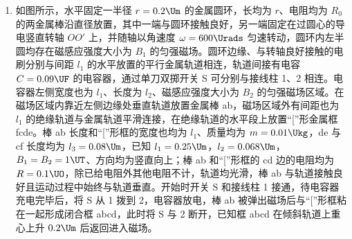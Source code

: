 \documentclass[\gkver]{gaokaozhenti}
\begin{document}
\begin{enumerate}
{	$mgl\sin37^{\circ}+mgR(1-\cos37^{\circ})=\frac{1}{2}mv^{2}$

	C 点时

	$F_{N}-mg=m\frac{v_{C}^{2}}{R}$

	$F_{N}=7\UN$

	（2）

	$mgl_{x}\sin37^{\circ}-4mgR\cos37^{\circ}=\frac{1}{2}mv^{2}$

	$v=\sqrt{12l_{x}-9.6}$

	能过最高点时，则能到 F 点，则恰到最高点时

	$mgl_{x}\sin37^{\circ}-mg(3R\cos37^{\circ}+R)=0$

	$l_{x}\geq0.85\Um$

	（3）设摩擦力做功为第一次到达中点时的 $n$ 倍

	$mgl_{x}\sin37^{\circ}-mg\frac{l_{FG}}{2}\sin37^{\circ}-n\mu mg\frac{l_{FG}}{2}\cos37^{\circ}=0$

	解得

	$l_{x}=\frac{7n+6}{15}$

	当 $n=1$ 时，$l_{x1}=\frac{13}{15}\Um$；当 $n=3$ 时，$l_{x2}=\frac{9}{5}\Um$；当 $n=5$ 时，$l_{x3}=\frac{41}{15}\Um$。
}

\item
如图所示，水平固定一半径 $r=0.2\Um$ 的金属圆环，长均为 $r$、电阻均为 $R_{0}$ 的两金属棒沿直径放置，其中一端与圆环接触良好，另一端固定在过圆心的导电竖直转轴 $OO'$ 上，并随轴以角速度 $\omega=600\Urads$ 匀速转动，圆环内左半圆均存在磁感应强度大小为 $B_{1}$ 的匀强磁场。圆环边缘、与转轴良好接触的电刷分别与间距 $l_{1}$ 的水平放置的平行金属轨道相连，轨道间接有电容 $C=0.09\UF$ 的电容器，通过单刀双掷开关 S 可分别与接线柱 1、2 相连。电容器左侧宽度也为 $l_{1}$、长度为 $l_{2}$、磁感应强度大小为 $B_{2}$ 的匀强磁场区域。在磁场区域内靠近左侧边缘处垂直轨道放置金属棒 ab，磁场区域外有间距也为 $l_{1}$ 的绝缘轨道与金属轨道平滑连接，在绝缘轨道的水平段上放置“[”形金属框 fcde。棒 ab 长度和“[”形框的宽度也均为 $l_{1}$、质量均为 $m=0.01\Ukg$，de 与 cf 长度均为 $l_{3}=0.08\Um$，已知 $l_{1}=0.25\Um$，$l_{2}=0.068\Um$，$B_{1}=B_{2}=1\UT$、方向均为竖直向上；棒 ab 和“[”形框的 cd 边的电阻均为 $R=0.1\UO$，除已给电阻外其他电阻不计，轨道均光滑，棒 ab 与轨道接触良好且运动过程中始终与轨道垂直。开始时开关 S 和接线柱 1 接通，待电容器充电完毕后，将 S 从 1 拨到 2，电容器放电，棒 ab 被弹出磁场后与“[”形框粘在一起形成闭合框 abcd，此时将 S 与 2 断开，已知框 abcd 在倾斜轨道上重心上升 $0.2\Um$ 后返回进入磁场。


\end{enumerate}
\end{document}
